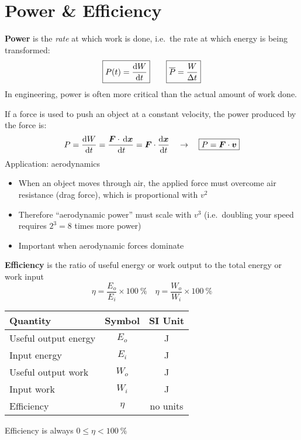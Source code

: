 \section{Power \& Efficiency}
\textbf{Power} is the \emph{rate} at which work is done, i.e.\ the rate at
which energy is being transformed:
\begin{equation}
  \boxed{P(t) = \diff Wt}\quad\quad
  \boxed{\overline P = \frac W{\Delta t}}
\end{equation}
In engineering, power is often more critical than the actual amount of work
done.

If a force is used to push an object at a constant velocity, the
power produced by the force is:
\begin{equation}
  P=\diff Wt=\frac{\bm F\cdot\dl{\bm x}}{\dl t}
  =\bm F\cdot\diff{\bm x}t
  \quad\rightarrow\quad
  \boxed{P=\bm F\cdot\bm v}
\end{equation}
Application: aerodynamics
\begin{itemize}
\item When an object moves through air, the applied force must overcome air
  resistance (drag force), which is proportional with $v^2$
\item Therefore ``aerodynamic power'' must scale with $v^3$ (i.e.\ doubling
  your speed requires $2^3=8$ times more power)
\item Important when aerodynamic forces dominate
\end{itemize}

\textbf{Efficiency} is the ratio of useful energy or work output to the total
energy or work input
\begin{equation}
  \boxed{ \eta = \frac{E_o}{E_i}\times\SI{100}\percent }\quad
  \boxed{ \eta = \frac{W_o}{W_i}\times\SI{100}\percent }
\end{equation}
\begin{center}
  \begin{tabular}{l|c|c}
    \rowcolor{pink}
    \textbf{Quantity} & \textbf{Symbol} & \textbf{SI Unit} \\ \hline
    Useful output energy & $E_o$  & \si\joule \\
    Input energy         & $E_i$  & \si\joule \\
    Useful output work   & $W_o$  & \si\joule \\
    Input work           & $W_i$  & \si\joule \\
    Efficiency           & $\eta$ & no units
  \end{tabular}
\end{center}
Efficiency is always $0\leq\eta<\SI{100}\percent$


